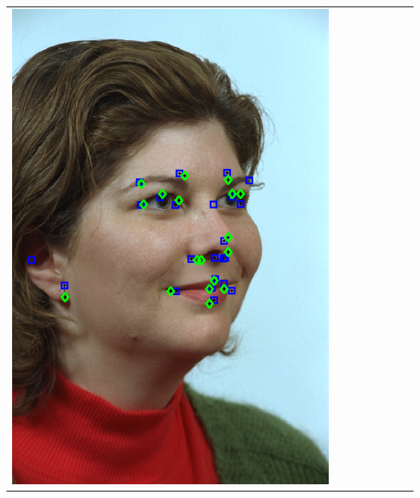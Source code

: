 \documentclass[landscape,final,a0paper,fontscale=0.27065]{baposter}
\begin{document}
\begin{poster}
{{\begin{tabular}{@{}rccccccc@{}}
 \parbox[c]{0.11\linewidth}{\includegraphics[width=\linewidth]{images/l_qr_success_1.pdf}} &

\end{tabular}}}
\end{poster}
\end{document}
